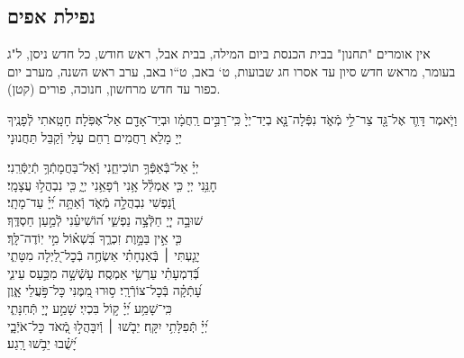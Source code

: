\documentclass[twoside, openany, parskip=half, 11pt]{book}
\begin{document}
\subsection*{ נפילת אפים }

\newcommand{\nefilasapayim}{

וַיֹּ֧אמֶר דָּוִ֛ד אֶל־גָּ֖ד צַר־לִ֣י מְֿאֹ֑ד נִפְּֿלָה־נָּ֤א בְיַד־יְיָ֙ כִּֽי־רַבִּ֣ים רַֽחֲמָ֔ו וּבְיַד־אָדָ֖ם אַל־אֶפֹּֽלָה׃
\firstword{רַחוּם וְֿחַנּוּן,}
חָטָֽאתִי לְֿפָנֶֽיךָ יְיָ מָלֵא רַחֲמִים רַחֵם עָלַי וְֿקַבֵּל תַּחֲנוּנָי
\begin{narrow}
יְיָ֗ אַל־בְּֿאַפְּֿךָ֥ תוֹכִיחֵ֑נִי \hfill וְֽֿאַל־בַּחֲמָתְֿךָ֥ תְֿיַסְּֿרֵֽנִי׃ \\
חׇנֵּ֥נִי יְיָ כִּ֤י אֻמְלַ֫ל אָ֥נִי \hfill רְֿפָאֵ֥נִי יְיָ֑ כִּ֖י נִבְהֲל֣וּ עֲצָמָֽי׃ \\
וְֿ֭נַפְשִׁי נִבְהֲלָ֣ה מְֿאֹ֑ד \hfill וְֿאַתָּ֥ה יְ֝יָ֗ עַד־מָתָֽי׃ \\
שׁוּבָ֣ה יְיָ֭ חַלְּֿצָ֣ה נַפְשִׁ֑י \hfill ה֝וֹשִׁיעֵ֗נִי לְֿמַ֣עַן חַסְדֶּֽךָ׃ \\
כִּ֤י אֵ֣ין בַּמָּ֣וֶת זִכְרֶ֑ךָ \hfill בִּ֝שְׁא֗וֹל מִ֣י יֽוֹדֶה־לָּֽךְ׃ \\
יָגַ֤עְתִּי ׀ בְּֽֿאַנְחָתִ֗י \hfill אַשְׂחֶ֣ה בְֿכׇל־לַ֭יְלָה מִטָּתִ֑י\\ בְּֿ֝דִמְעָתִ֗י עַרְשִׂ֥י אַמְסֶֽה׃ \hfill
עָשְֿׁשָׁ֣ה מִכַּ֣עַס עֵינִ֑י \\ עָ֝תְֿקָ֗ה בְּֿכׇל־צוֹרְֿרָֽי׃ \hfill
ס֣וּרוּ מִ֭מֶּנִּי כׇּל־פֹּ֣עֲלֵי אָ֑וֶן \\ כִּֽי־שָׁמַ֥ע יְ֝יָ֗ ק֣וֹל בִּכְיִֽי׃ \hfill
שָׁמַ֣ע יְיָ֭ תְּֿחִנָּתִ֑י \\ יְ֝יָ֗ תְּֽֿפִלָּתִ֥י יִקָּֽח׃ \hfill
יֵבֹ֤שׁוּ ׀ וְֿיִבָּהֲל֣וּ מְֿ֭אֹד כׇּל־אֹיְֿבָ֑י \\ יָ֝שֻׁ֗בוּ יֵבֹ֥שׁוּ רָֽגַע׃ \hfill \break
\end{narrow}\negline
}



\begin{scriptsize}

\textsf{
אין אומרים "תחנון" בבית הכנסת ביום המילה, בבית אבל, ראש חודש, כל חדש ניסן, ל"ג בעומר, מראש חדש סיון עד אסרו חג שבועות, ט` באב, ט``ו באב, ערב ראש השנה, מערב יום כפור עד חדש מרחשון, חנוכה, פורים (קטן).
}

\end{scriptsize}
\nefilasapayim \label{nefilas_apayim}

\negline
\end{document}
